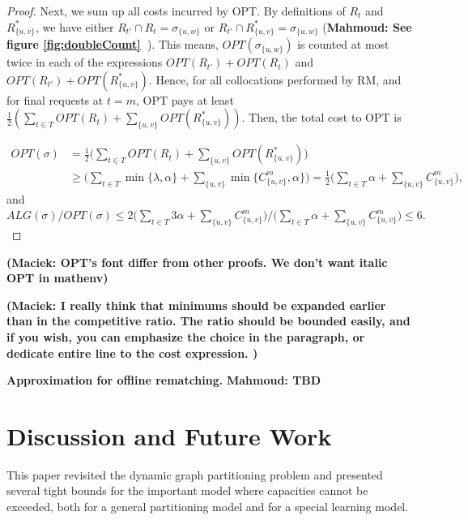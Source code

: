 \documentclass[a4paper,anonymous,USenglish]{lipics-v2019}
\newcommand{\OPT}{\textsc{OPT}\xspace}
\newcommand{\OPTM}{\mathit{OPT}}
\newcommand{\RM}{\textsc{RM}\xspace} %
\newcommand\mahmoud[1]{\color{orange}\textbf{Mahmoud: #1~}\color{black}}
\newcommand\maciek[1]{\color{brown}\textbf{(Maciek: #1)}\color{black}}
\begin{document}
\begin{proof}
	Next, we sum up all costs incurred by \OPT.
	By definitions of $R_t$ and $R^*_{\{u,v\}}$, we have either
	$R_{t'} \cap R_t = \sigma_{\{u,w\}}$ or
	$R_{t'} \cap R^*_{\{u,v\}} = \sigma_{\{u,w\}}$
	(\mahmoud{See figure \ref{fig:doubleCount}}). 
	This means,
	$\OPTM ( \sigma_{\{u,w\}})$
	is counted at most twice in each of  the expressions
	$\mathit{OPT} (R_{t'}) + \mathit{OPT} (R_t)$
	and  
	$\mathit{OPT} (R_{t'}) + \mathit{OPT} (R^*_{\{u,v\}})$.
	Hence,
	for all collocations performed by \RM,
	and for final requests at $t=m$,
	\OPT pays at least 
	$\frac{1}{2}(
	\sum_{ t \in T } \mathit{OPT} (R_t) +
	\sum_{\{u,v\}} \mathit{OPT} (R^*_{\{u,v\}})
	) $.
	Then,
	the total cost to \OPT is
	
	\begin{align*} 	%
		\mathit{OPT} (\sigma)
		&=
		\frac{1}{2}
		\Big(
		\sum_{ t \in T} \mathit{OPT} (R_t) 
		+ \sum_{\{u,v\}}\mathit{OPT} (R^*_{\{u,v\}})
		\Big)	\\
		&\geq
		\Big(
		\sum_{ t \in T} \min{ \{ \lambda, \alpha \}}  +
		\sum_{\{u,v\}} \min{ \{C^{m}_{\{u,v\}} , \alpha \} } 
		\Big)		
		=
		\frac{1}{2}		
		\Big(
		\sum_{ t \in T} \alpha  
		+ \sum_{\{u,v\}} C^{m}_{\{u,v\}}
		\Big),
	\end{align*}
and
$
	\mathit{ALG} (\sigma)	/
	\mathit{OPT} (\sigma)
	\leq
	2\Big(
	\sum_{ t \in T} 3\alpha +
	\sum_{\{u,v\}} C^{m}_{\{u,v\}}
	\Big)	 \big /
	\Big(
	\sum_{ t \in T} \alpha  
	+ \sum_{\{u,v\}} C^{m}_{\{u,v\}}  
	\Big) 	\leq 6.
$
\end{proof}

\maciek{OPT's font differ from other proofs. We don't want italic OPT in mathenv}

\maciek{I really think that minimums should be expanded earlier than in the competitive ratio. The ratio should be bounded easily, and if you wish, you can emphasize the choice in the paragraph, or dedicate entire line to the cost expression. }

\noindent
\textbf{Approximation for offline rematching.}
\mahmoud{TBD}


\section{Discussion and Future Work}

This paper revisited the dynamic graph partitioning problem and presented several tight bounds for the important model where capacities cannot be exceeded, both for a general partitioning model and for a special learning model. 
\end{document}
